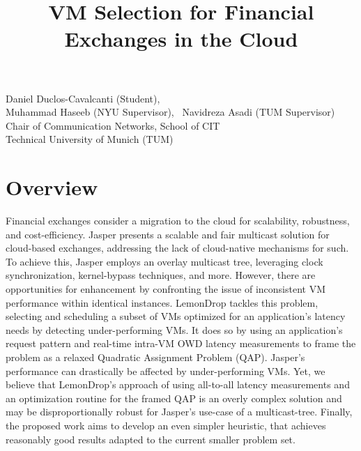 \documentclass{article}
\title{VM Selection for Financial Exchanges in the Cloud}
\makeatletter
\renewcommand{\maketitle}{%
    \thispagestyle{fancy}%
    \begin{center}
        \Large\bfseries\@title
    \end{center}
    \vspace{-0.25cm}
    \begin{center}
        Daniel Duclos-Cavalcanti (Student),
        \\
        Muhammad Haseeb (NYU Supervisor),
        ~Navidreza Asadi (TUM Supervisor) 
        \\Chair of Communication Networks, School of CIT
        \\Technical University of Munich (TUM)
    \end{center}
}
\makeatother
\begin{document}
\maketitle

\section{Overview}


Financial exchanges consider a migration to the cloud for scalability, robustness, and cost-efficiency.
Jasper \cite{haseeb2024jasper} presents a scalable and fair multicast solution for cloud-based exchanges, 
addressing the lack of cloud-native mechanisms for such. 
To achieve this, Jasper employs an overlay multicast tree, leveraging clock synchronization, kernel-bypass techniques, 
and more.
However, there are opportunities for enhancement by confronting the issue of inconsistent VM performance 
within identical instances. LemonDrop \cite{sachidananda2022scheduling} tackles this problem,
selecting and scheduling a subset of VMs optimized for an application's latency needs by detecting under-performing VMs. 
It does so by using an application's request pattern and real-time intra-VM OWD latency measurements to 
frame the problem as a relaxed Quadratic Assignment Problem (QAP). 
Jasper's performance can drastically be affected by under-performing VMs.
Yet, we believe that LemonDrop's approach of using all-to-all latency measurements and an optimization routine 
for the framed QAP is an overly complex solution and may be disproportionally robust 
for Jasper's use-case of a multicast-tree. 
Finally, the proposed work aims to develop an even simpler heuristic, that achieves reasonably good results 
adapted to the current smaller problem set.
\end{document}
